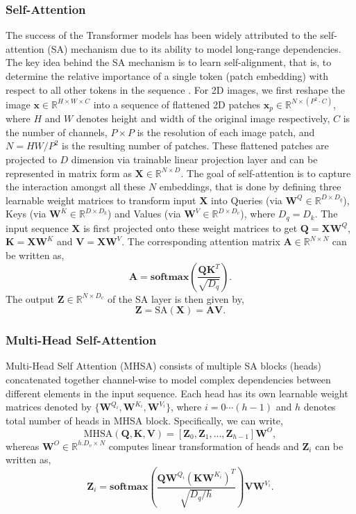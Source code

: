 \documentclass[10pt,journal,compsoc]{IEEEtran}
\begin{document}
\subsubsection{\textbf{Self-Attention}}The success of the Transformer models has been widely attributed to the self-attention (SA) mechanism due to its ability to model long-range dependencies. The key idea behind the SA mechanism is to learn self-alignment, that is, to determine the relative importance of a single token (patch embedding) with respect to all other tokens in the sequence \cite{bahdanau2014neural}.
For 2D images, we first reshape the image $\mathbf{x} \in \mathbb{R}^{H \times W \times C}$ into a sequence of flattened 2D patches $\mathbf{x}_p \in \mathbb{R}^{N\times(P^2·C)}$, where $H$ and $W$ denotes height and width of the original image respectively, $C$ is the number of channels, $P \times P$ is the resolution of each image patch, and $N = HW/P^2$ is the resulting number of patches. These flattened patches are projected to $D$ dimension via trainable linear projection layer and can be represented in matrix form as $\mathbf{X} \in \mathbb{R}^{N \times D}$. The goal of self-attention is to capture the interaction amongst all these $N$ embeddings, that is done by defining three learnable weight matrices to transform input $\mathbf{X}$ into Queries (via $\mathbf{W}^Q \in \mathbb{R}^{D \times D_q}$), Keys (via $\mathbf{W}^K \in \mathbb{R}^{D \times D_k}$) and Values (via $\mathbf{W}^V \in \mathbb{R}^{D \times D_v}$), where $D_q = D_k$. The input sequence $\mathbf{X}$ is first projected onto these weight matrices to get $\mathbf{Q}=\mathbf{X}\mathbf{W}^Q$, $\mathbf{K}=\mathbf{X}\mathbf{W}^K$ and $\mathbf{V}=\mathbf{X}\mathbf{W}^V$.
The corresponding attention matrix $\mathbf{A} \in \mathbb{R}^{N \times N}$ can be written as,
$$\mathbf{A} = \mathbf{softmax}\left (\frac{\mathbf{Q}\mathbf{K}^T}{\sqrt{D_q}}\right ).$$
The output $\mathbf{Z}\in\mathbb{R}^{N \times D_v}$ of the SA layer is then given by,
$$ \mathbf{Z} = \text{SA}(\mathbf{X}) =  \mathbf{A}\mathbf{V}.$$

\subsubsection{\textbf{Multi-Head Self-Attention}} Multi-Head Self Attention (MHSA) consists of multiple SA blocks (heads) concatenated together channel-wise to model complex dependencies between different elements in the input sequence. Each head has its own learnable weight matrices denoted by  $\{\mathbf{W}^{Q_i},\mathbf{W}^{K_i},\mathbf{W}^{V_i} \}$, where $i=0 \cdots (h{-}1)$ and $h$ denotes total number of heads in MHSA block. Specifically, we can write,
$$\text{MHSA}(\mathbf{Q},\mathbf{K},\mathbf{V}) = [\mathbf{Z}_0,\mathbf{Z}_1,...,\mathbf{Z}_{h-1}]\mathbf{W}^{O},$$
whereas $\mathbf{W}^{O} \in \mathbb{R}^{h.D_v \times N}$ computes linear transformation of heads and $\mathbf{Z}_i$ can be written as,
$$ \mathbf{Z}_i = \mathbf{softmax}\left (\frac{\mathbf{QW}^{Q_i}(\mathbf{KW}^{K_i})^{T}}{\sqrt{D_q/h}}\right ) \mathbf{VW}^{V_i}.$$
\end{document}
